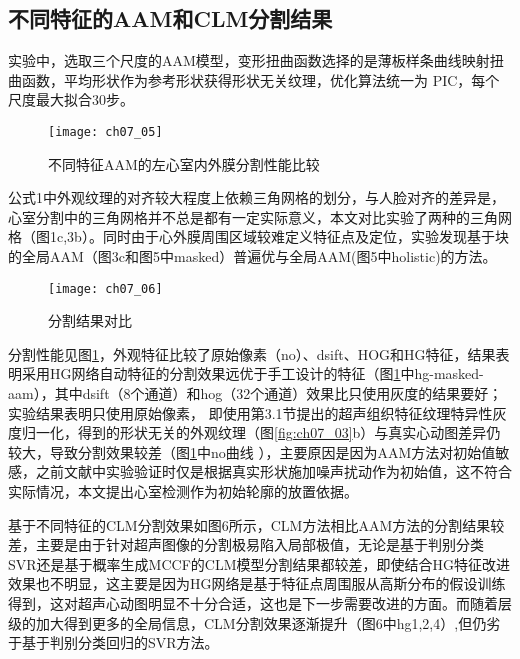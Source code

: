 \subsection{不同特征的AAM和CLM分割结果}
实验中，选取三个尺度的AAM模型，变形扭曲函数选择的是薄板样条曲线映射扭曲函数，平均形状作为参考形状获得形状无关纹理，优化算法统一为 PIC，每个尺度最大拟合30步。
\begin{figure}[!htbp]
\centering
\texttt{[image: ch07\_05]}
\caption{不同特征AAM的左心室内外膜分割性能比较}
\label{fig:ch07_05}
\end{figure}  

公式1中外观纹理的对齐较大程度上依赖三角网格的划分，与人脸对齐的差异是，心室分割中的三角网格并不总是都有一定实际意义，本文对比实验了两种的三角网格（图1c,3b）。同时由于心外膜周围区域较难定义特征点及定位，实验发现基于块的全局AAM（图3c和图5中masked）普遍优与全局AAM(图5中holistic)的方法。
\begin{figure}[!htbp]
\centering
\texttt{[image: ch07\_06]}
\caption{分割结果对比}
\label{fig:ch07_06}
\end{figure}  
 
 
分割性能见图\ref{fig:ch07_05}，外观特征比较了原始像素（no）、dsift\citep{Lowe2004}、HOG和HG特征，结果表明采用HG网络自动特征的分割效果远优于手工设计的特征（图\ref{fig:ch07_05}中hg-masked-aam），其中dsift（8个通道）和hog（32个通道）效果比只使用灰度的结果要好；实验结果表明只使用原始像素，
即使用第3.1节提出的超声组织特征纹理特异性灰度归一化，得到的形状无关的外观纹理（图\ref{fig:ch07_03}b）与真实心动图差异仍较大，导致分割效果较差（图\ref{fig:ch07_05}中no曲线 ），主要原因是因为AAM方法对初始值敏感，之前文献\citep{Bosch2002,Hansson2014}中实验验证时仅是根据真实形状施加噪声扰动作为初始值\citep{jixianghu-2016}，这不符合实际情况，本文提出心室检测作为初始轮廓的放置依据。

基于不同特征的CLM分割效果如图6所示，CLM方法相比AAM方法的分割结果较差，主要是由于针对超声图像的分割极易陷入局部极值，无论是基于判别分类SVR还是基于概率生成MCCF的CLM模型分割结果都较差，即使结合HG特征改进效果也不明显，这主要是因为HG网络是基于特征点周围服从高斯分布的假设训练得到，这对超声心动图明显不十分合适，这也是下一步需要改进的方面。而随着层级的加大得到更多的全局信息，CLM分割效果逐渐提升（图6中hg1,2,4）,但仍劣于基于判别分类回归的SVR方法。
